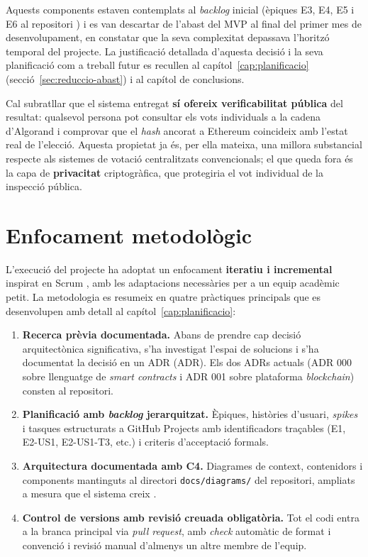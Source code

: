 Aquests components estaven contemplats al \emph{backlog} inicial
(èpiques E3, E4, E5 i E6 al repositori \cite{demochainrepo}) i es van
descartar de l'abast del \ac{MVP} al final del primer mes de
desenvolupament, en constatar que la seva complexitat depassava
l'horitzó temporal del projecte. La justificació detallada d'aquesta
decisió i la seva planificació com a treball futur es recullen al
capítol~\ref{cap:planificacio} (secció~\ref{sec:reduccio-abast}) i al
capítol de conclusions.

Cal subratllar que el sistema entregat \textbf{sí ofereix
verificabilitat pública} del resultat: qualsevol persona pot consultar
els vots individuals a la cadena d'Algorand i comprovar que el
\emph{hash} ancorat a Ethereum coincideix amb l'estat real de
l'elecció. Aquesta propietat ja és, per ella mateixa, una millora
substancial respecte als sistemes de votació centralitzats
convencionals; el que queda fora és la capa de \textbf{privacitat}
criptogràfica, que protegiria el vot individual de la inspecció
pública.

\section{Enfocament metodològic}
\label{sec:metodologia}

L'execució del projecte ha adoptat un enfocament \textbf{iteratiu i
incremental} inspirat en Scrum \cite{schwaber2020scrum}, amb les
adaptacions necessàries per a un equip acadèmic petit. La metodologia
es resumeix en quatre pràctiques principals que es desenvolupen amb
detall al capítol~\ref{cap:planificacio}:

\begin{enumerate}
    \item \textbf{Recerca prèvia documentada.} Abans de prendre cap
    decisió arquitectònica significativa, s'ha investigat l'espai de
    solucions i s'ha documentat la decisió en un \acl{ADR} (\ac{ADR}).
    Els dos \acp{ADR} actuals (\acl{ADR} 000 sobre llenguatge de
    \emph{smart contracts} i \acl{ADR} 001 sobre plataforma
    \emph{blockchain}) consten al repositori.

    \item \textbf{Planificació amb \emph{backlog} jerarquitzat.}
    Èpiques, històries d'usuari, \emph{spikes} i tasques estructurats
    a GitHub Projects amb identificadors traçables (E1, E2-US1,
    E2-US1-T3, etc.) i criteris d'acceptació formals.

    \item \textbf{Arquitectura documentada amb C4.} Diagrames de
    context, contenidors i components mantinguts al directori
    \texttt{docs/diagrams/} del repositori, ampliats a mesura que el
    sistema creix \cite{brown2018c4}.

    \item \textbf{Control de versions amb revisió creuada
    obligatòria.} Tot el codi entra a la branca principal via
    \emph{pull request}, amb \emph{check} automàtic de format i
    convenció i revisió manual d'almenys un altre membre de l'equip.
\end{enumerate}

